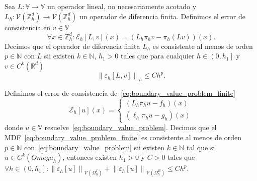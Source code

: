 \begin{definition}
	Sea
	\begin{math}
		L\colon\mathbb{V}\to\mathbb{V}
	\end{math}
	un operador lineal, no necesariamente acotado y
	\begin{math}
		L_{h}\colon
		\mathcal{V}\left(\mathbb{Z}^{d}_{h}\right)\to
		\mathcal{V}\left(\mathbb{Z}^{d}_{h}\right)
	\end{math}
	un operador de diferencia finita.
	Definimos el error de consistencia en $v\in\mathbb{V}$
	\begin{equation*}
		\forall x\in\mathbb{Z}^{d}_{h}:
		\mathcal{E}_{h}\left[L,v\right]\left(x\right)=
		\left(L_{h}\pi_{h}v-\pi_{h}\left(Lv\right)\right)
		\left(x\right).
	\end{equation*}
	Decimos que el operador de diferencia finita $L_{h}$ es
	consistente al menos de orden $p\in\mathbb{N}$ con $L$ sii
	existen $k\in\mathbb{N}$, $h_{1}>0$ tales que para cualquier
	\begin{math}
		h\in\left(0,h_{1}\right]
	\end{math}
	y
	\begin{math}
		v\in C^{k}\left(\mathbb{R}^{d}\right)
	\end{math}
	\begin{equation*}
		{\left\|\varepsilon_{h}\left[L,v\right]\right\|}_{h}\leq
		C h^{p}.
	\end{equation*}
\end{definition}

\begin{definition}[Consistencia]
	Definimos el error de consistencia
	de~\eqref{eq:boundary_value_problem_finite}
	\begin{equation*}
		\mathcal{E}_{h}
		\left[u\right]
		\left(x\right)=
		\begin{cases}
			\left(L_{h}\pi_{h}u-f_{h}\right)\left(x\right) \\
			\left(\ell_{h}\pi_{h}u-g_{h}\right)\left(x\right)
		\end{cases}
	\end{equation*}
	donde $u\in\mathbb{V}$
	resuelve~\eqref{eq:boundary_value_problem}.
	Decimos que el MDF~\eqref{eq:boundary_value_problem_finite} es
	consistente al menos de orden $p\in\mathbb{N}$
	con~\eqref{eq:boundary_value_problem} sii existen
	$k\in\mathbb{N}$ tal que si
	\begin{math}
		u\in C^{k}\left(\overline{Omega}_{h}\right)
	\end{math},
	entonces existen $h_{1}>0$ y $C>0$ tales que
	\begin{math}
		\forall h\in\left(0,h_{1}\right]:
		{
		\left\|\mathcal{\varepsilon}_{h}\left[u\right]\right\|
		}_{\mathcal{V}\left(\Omega^{I}_{h}\right)}+
		{
		\left\|\mathcal{\varepsilon}_{h}\left[u\right]\right\|
		}_{\mathcal{V}\left(\Omega^{B}_{h}\right)}\leq
		C h^{p}
	\end{math}.
\end{definition}

